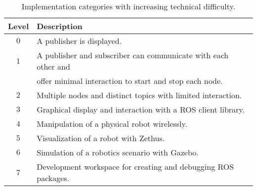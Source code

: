         \begin{table}[htbp]
            \color{textColor}
            \centering	
            \caption{Implementation categories with increasing technical difficulty.}
                \begin{tabular}{cl}
                    \toprule
                    \textbf{Level} & \textbf{Description} \\
                    \midrule
                    $0$ & A publisher is displayed. \\ [0.3em]
                    $1$ & A publisher and subscriber can communicate with each other and \\
                        & offer minimal interaction to start and stop each node. \\[0.3em]
                    $2$ & Multiple nodes and distinct topics with limited interaction. \\[0.3em]
                    $3$ & Graphical display and interaction with a ROS client library. \\[0.3em]
                    $4$ & Manipulation of a physical robot wirelessly. \\[0.3em]
                    $5$ & Visualization of a robot with Zethus. \\[0.3em]
                    $6$ & Simulation of a robotics scenario with Gazebo. \\[0.3em]
                    $7$ & Development workspace for creating and debugging ROS packages. \\
                \bottomrule
            \end{tabular}\label{tab:techlevels}
        \end{table}






        


        

